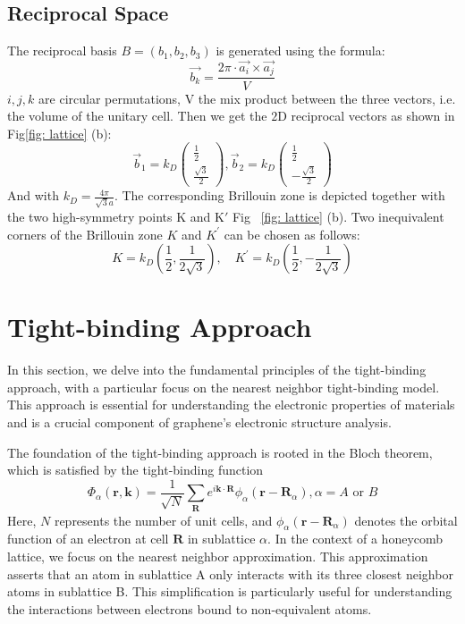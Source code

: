 \subsection{Reciprocal Space}
The reciprocal basis $B=\left(b_{1}, b_{2}, b_{3}\right)$ is generated using the formula:
$$
\overrightarrow{b_{k}}=\frac{2 \pi \cdot \overrightarrow{a_{i}} \times \overrightarrow{a_{j}}}{V}
$$
$i, j, k$ are circular permutations, $\mathrm{V}$ the mix product between the three vectors, i.e. the volume of the unitary cell.  Then we get the $2 \mathrm{D}$ reciprocal vectors as shown in Fig\ref{fig: lattice} (b):
$$
\vec b_{1}=k_{D}\left(\begin{array}{l}
\frac{1}{2} \\
\frac{\sqrt{3}}{2} 
\end{array}\right),
\vec b_{2}=k_{D}\left(\begin{array}{c}
\frac{1}{2} \\
-\frac{\sqrt{3}}{2} 
\end{array}\right)
$$
And with $k_{D}=\frac{4 \pi}{\sqrt{3} a}$. The corresponding Brillouin zone is depicted together with the two high-symmetry points $\mathrm{K}$ and $\mathrm{K'}$ Fig ~\ref{fig: lattice} (b).
Two inequivalent corners of the Brillouin zone $K$ and $K^{\prime}$ can be chosen as follows:
$$
K=k_{D}\left(\frac{1}{2}, \frac{1}{2 \sqrt{3}}\right), \quad K^{\prime}=k_{D}\left(\frac{1}{2},-\frac{1}{2 \sqrt{3}}\right)
$$

\section{Tight-binding Approach \label{sec:tightbinding}}

In this section, we delve into the fundamental principles of the tight-binding approach, with a particular focus on the nearest neighbor tight-binding model. This approach is essential for understanding the electronic properties of materials and is a crucial component of graphene's electronic structure analysis.

The foundation of the tight-binding approach is rooted in the Bloch theorem, which is satisfied by the tight-binding function
\begin{equation}
\Phi_{\alpha}(\mathbf{r}, \mathbf{k})=\frac{1}{\sqrt{N}} \sum_{\mathbf{R}} e^{i \mathbf{k} \cdot \mathbf{R}} \phi_{\alpha}\left(\mathbf{r}-\mathbf{R}_{\alpha}\right), \alpha=A \text { or } B
\label{eqn:Bloch}
\end{equation}
Here, $N$ represents the number of unit cells, and $\phi_{\alpha}(\mathbf{r} - \mathbf{R}_{\alpha})$ denotes the orbital function of an electron at cell $\mathbf{R}$ in sublattice $\alpha$.
In the context of a honeycomb lattice, we focus on the nearest neighbor approximation. This approximation asserts that an atom in sublattice A only interacts with its three closest neighbor atoms in sublattice B. This simplification is particularly useful for understanding the interactions between electrons bound to non-equivalent atoms.

